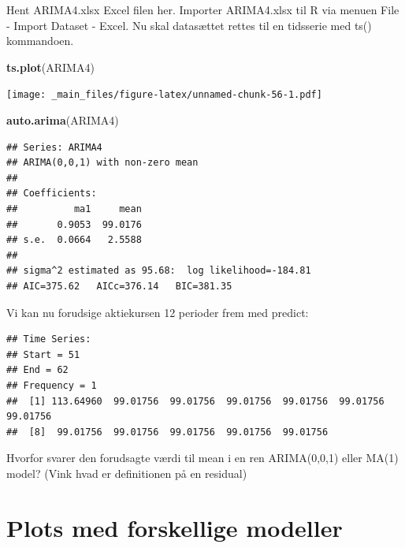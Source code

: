 \documentclass[]{book}
\newenvironment{Shaded}{\begin{snugshade}}{\end{snugshade}}
\newcommand{\DataTypeTok}[1]{\textcolor[rgb]{0.13,0.29,0.53}{#1}}
\newcommand{\DecValTok}[1]{\textcolor[rgb]{0.00,0.00,0.81}{#1}}
\newcommand{\KeywordTok}[1]{\textcolor[rgb]{0.13,0.29,0.53}{\textbf{#1}}}
\newcommand{\NormalTok}[1]{#1}
\newcommand{\OperatorTok}[1]{\textcolor[rgb]{0.81,0.36,0.00}{\textbf{#1}}}
\begin{document}
Hent ARIMA4.xlsx Excel filen her. Importer ARIMA4.xlsx til R via menuen File - Import Dataset - Excel. Nu skal datasættet rettes til en tidsserie med ts() kommandoen.

\begin{Shaded}
\begin{Highlighting}[]
\KeywordTok{ts.plot}\NormalTok{(ARIMA4)}
\end{Highlighting}
\end{Shaded}

\texttt{[image: \_main\_files/figure-latex/unnamed-chunk-56-1.pdf]}

\begin{Shaded}
\begin{Highlighting}[]
\KeywordTok{auto.arima}\NormalTok{(ARIMA4)}
\end{Highlighting}
\end{Shaded}

\begin{verbatim}
## Series: ARIMA4 
## ARIMA(0,0,1) with non-zero mean 
## 
## Coefficients:
##          ma1     mean
##       0.9053  99.0176
## s.e.  0.0664   2.5588
## 
## sigma^2 estimated as 95.68:  log likelihood=-184.81
## AIC=375.62   AICc=376.14   BIC=381.35
\end{verbatim}

Vi kan nu forudsige aktiekursen 12 perioder frem med predict:

\begin{Shaded}
\end{Shaded}

\begin{verbatim}
## Time Series:
## Start = 51 
## End = 62 
## Frequency = 1 
##  [1] 113.64960  99.01756  99.01756  99.01756  99.01756  99.01756  99.01756
##  [8]  99.01756  99.01756  99.01756  99.01756  99.01756
\end{verbatim}

Hvorfor svarer den forudsagte værdi til mean i en ren ARIMA(0,0,1) eller MA(1) model? (Vink hvad er definitionen på en residual)

\hypertarget{plots-med-forskellige-modeller}{%
\section{Plots med forskellige modeller}\label{plots-med-forskellige-modeller}}
\end{document}
